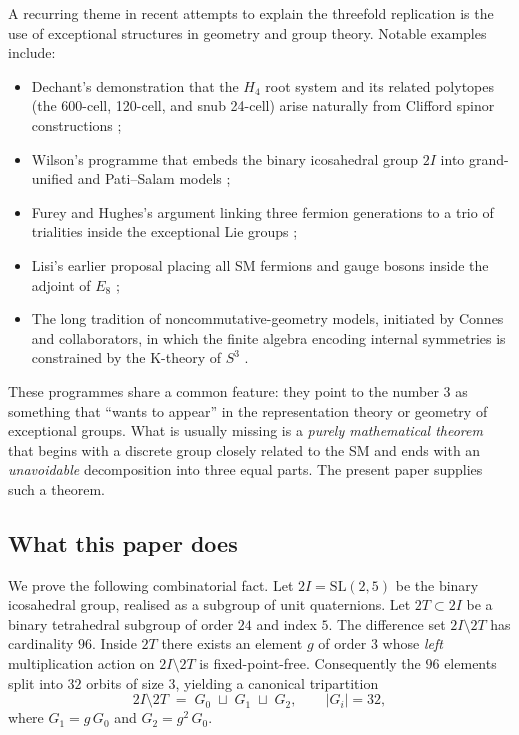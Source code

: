 \documentclass[10pt,reqno]{amsart}
\theoremstyle{plain}
\theoremstyle{definition}
\begin{document}
A recurring theme in recent attempts to explain the threefold replication is the use of exceptional structures in geometry and group theory. Notable examples include:
\begin{itemize}
\item Dechant's demonstration that the $H_4$ root system and its related polytopes (the 600-cell, 120-cell, and snub 24-cell) arise naturally from Clifford spinor constructions \cite{Dechant2021};
\item Wilson's programme that embeds the binary icosahedral group $2I$ into grand-unified and Pati--Salam models \cite{Wilson2021,Wilson2024};
\item Furey and Hughes's argument linking three fermion generations to a trio of trialities inside the exceptional Lie groups \cite{FureyHughes2024};
\item Lisi's earlier proposal placing all SM fermions and gauge bosons inside the adjoint of $E_8$ \cite{Lisi2007};
\item The long tradition of noncommutative-geometry models, initiated by Connes and collaborators, in which the finite algebra encoding internal symmetries is constrained by the K-theory of $S^3$ \cite{ConnesMarcolli2008,Chamseddine2025}.
\end{itemize}

These programmes share a common feature: they point to the number $3$ as something that ``wants to appear'' in the representation theory or geometry of exceptional groups. What is usually missing is a \emph{purely mathematical theorem} that begins with a discrete group closely related to the SM and ends with an \emph{unavoidable} decomposition into three equal parts. The present paper supplies such a theorem.

\subsection*{What this paper does}

We prove the following combinatorial fact. Let $2I = \mathrm{SL}(2,5)$ be the binary icosahedral group, realised as a subgroup of unit quaternions. Let $2T \subset 2I$ be a binary tetrahedral subgroup of order $24$ and index $5$. The difference set $2I \setminus 2T$ has cardinality $96$. Inside $2T$ there exists an element $g$ of order $3$ whose \emph{left} multiplication action on $2I \setminus 2T$ is fixed-point-free. Consequently the $96$ elements split into $32$ orbits of size $3$, yielding a canonical tripartition
\begin{equation}\label{eq:tripartition}
2I \setminus 2T \;=\; G_0 \;\sqcup\; G_1 \;\sqcup\; G_2,
\qquad |G_i| = 32,
\end{equation}
where $G_1 = g\,G_0$ and $G_2 = g^{2}\,G_0$.
\end{document}

